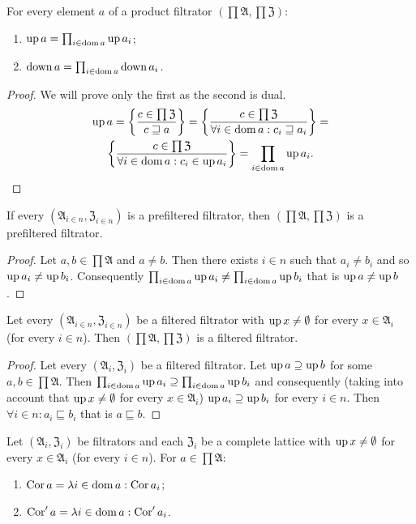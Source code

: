 \begin{prop}
For every element $a$ of a product filtrator $\left(\prod\mathfrak{A},\prod\mathfrak{Z}\right)$:
\begin{enumerate}
\item $\operatorname{up} a=\prod_{i\in\operatorname{dom} a}\operatorname{up} a_{i}$;
\item $\operatorname{down} a=\prod_{i\in\operatorname{dom} a}\operatorname{down} a_{i}$.
\end{enumerate}
\end{prop}
\begin{proof}
We will prove only the first as the second is dual.
\begin{multline*}
\operatorname{up} a=\left\{ \frac{c\in\prod\mathfrak{Z}}{c\sqsupseteq a}\right\}=\left\{ \frac{c\in\prod\mathfrak{Z}}{\forall i\in\operatorname{dom} a:c_{i}\sqsupseteq a_{i}}\right\}=\\
\left\{ \frac{c\in\prod\mathfrak{Z}}{\forall i\in\operatorname{dom} a:c_{i}\in\operatorname{up} a_{i}}\right\}=\prod_{i\in\operatorname{dom} a}\operatorname{up} a_{i}.
\end{multline*}
\end{proof}
\begin{prop}
If every $(\mathfrak{A}_{i\in n},\mathfrak{Z}_{i\in n})$ is a prefiltered
filtrator, then $\left(\prod\mathfrak{A},\prod\mathfrak{Z}\right)$
is a prefiltered filtrator.\end{prop}
\begin{proof}
Let $a,b\in\prod\mathfrak{A}$ and $a\neq b$. Then there exists $i\in n$
such that $a_{i}\neq b_{i}$ and so $\operatorname{up} a_{i}\neq\operatorname{up} b_{i}$. Consequently
$\prod_{i\in\operatorname{dom} a}\operatorname{up} a_{i}\neq\prod_{i\in\operatorname{dom} a}\operatorname{up} b_{i}$
that is $\operatorname{up} a\neq\operatorname{up} b$.\end{proof}
\begin{prop}
Let every $(\mathfrak{A}_{i\in n},\mathfrak{Z}_{i\in n})$ be a filtered
filtrator with $\operatorname{up} x\neq\emptyset$ for every $x\in\mathfrak{A}_{i}$
(for every $i\in n$). Then $\left(\prod\mathfrak{A},\prod\mathfrak{Z}\right)$
is a filtered filtrator.\end{prop}
\begin{proof}
Let every $(\mathfrak{A}_{i},\mathfrak{Z}_{i})$ be a filtered filtrator.
Let $\operatorname{up} a\supseteq\operatorname{up} b$ for some $a,b\in\prod\mathfrak{A}$. Then
$\prod_{i\in\operatorname{dom} a}\operatorname{up} a_{i}\supseteq\prod_{i\in\operatorname{dom} a}\operatorname{up} b_{i}$
and consequently (taking into account that $\operatorname{up} x\neq\emptyset$ for
every $x\in\mathfrak{A}_{i}$) $\operatorname{up} a_{i}\supseteq\operatorname{up} b_{i}$ for
every $i\in n$. Then $\forall i\in n:a_{i}\sqsubseteq b_{i}$ that
is $a\sqsubseteq b$.\end{proof}
\begin{prop}
Let $(\mathfrak{A}_{i},\mathfrak{Z}_{i})$ be filtrators and each
$\mathfrak{Z}_{i}$ be a complete lattice with $\operatorname{up} x\neq\emptyset$
for every $x\in\mathfrak{A}_{i}$ (for every $i\in n$). For $a\in\prod\mathfrak{A}$:
\begin{enumerate}
\item $\operatorname{Cor} a=\lambda i\in\operatorname{dom} a:\operatorname{Cor} a_{i}$;
\item $\operatorname{Cor}'a=\lambda i\in\operatorname{dom} a:\operatorname{Cor}'a_{i}$.
\end{enumerate}
\end{prop}
